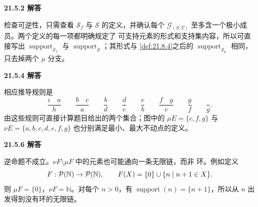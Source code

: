 \begin{taplauthorsolutionentrybox}
\label{sol:author:21.5.2}
\textbf{21.5.2 解答}

检查可逆性，只需查看 \(\mathcal S_f\) 与 \(\mathcal S\) 的定义，并确认每个
\(\mathcal G_{(S,T)}\) 至多含一个极小成员。两个定义的每一项都明确规定了
可支持元素的形式和支持集内容，所以可直接写出
\(\operatorname{support}_{\mathcal S_f}\) 与
\(\operatorname{support}_{\mathcal S}\)；其形式与
\cref{def:21.8.4}之后的 \(\operatorname{support}_{\mathcal S_\mu}\) 相同，
只去掉两个 \(\mu\) 分支。


\end{taplauthorsolutionentrybox}

\begin{taplauthorsolutionentrybox}
\label{sol:author:21.5.4}
\textbf{21.5.4 解答}

相应推导规则是
\[
\frac{i\quad a}{h}
\qquad
\frac{b\quad c}{a}
\qquad
\frac{b}{d}
\qquad
\frac{d}{e}
\qquad
\frac{e}{b}
\qquad
\frac{f\quad g}{c}
\qquad
\frac{g}{f}
\qquad
\frac{}{g}.
\]
由这些规则可直接计算题目给出的两个集合；图中的
\(\mu E=\{c,f,g\}\) 与
\(\nu E=\{a,b,c,d,e,f,g\}\) 也分别满足最小、最大不动点的定义。

\end{taplauthorsolutionentrybox}

\begin{taplauthorsolutionentrybox}
\label{sol:author:21.5.6}
\textbf{21.5.6 解答}

逆命题不成立。\(\nu F\setminus\mu F\) 中的元素也可能通向一条无限链，而非
环。例如定义
\[
F:\mathcal{P}(\mathbb N)\to\mathcal{P}(\mathbb N),\qquad
F(X)=\{0\}\cup\{n\mid n+1\in X\}.
\]
则 \(\mu F=\{0\}\)，\(\nu F=\mathbb N\)。对每个 \(n>0\)，有
\(\operatorname{support}(n)=\{n+1\}\)，所以从 \(n\) 出发得到没有环的无限链。

\end{taplauthorsolutionentrybox}


